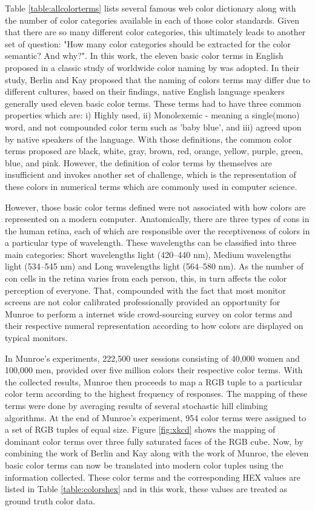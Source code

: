 Table \ref{table:allcolorterms} lists several famous web color dictionary along with the number of color categories available in each of those color standards. Given that there are so many different color categories, this ultimately leads to another set of question: "How many color categories should be extracted for the color semantic? And why?". In this work, the eleven basic color terms in English proposed in a classic study of worldwide color naming by \cite{berlinandkay} was adopted. In their study, Berlin and Kay proposed that the naming of colors terms may differ due to different cultures, based on their findings, native English language speakers generally used eleven basic color terms. These terms had to have three common properties which are: i) Highly used, ii) Monolexemic - meaning a single(mono) word, and not compounded color term such as 'baby blue', and iii) agreed upon by native speakers of the language. With those definitions, the common color terms proposed are black, white, gray, brown, red, orange, yellow, purple, green, blue, and pink. However, the definition of color terms by themselves are insufficient and invokes another set of challenge, which is the representation of these colors in numerical terms which are commonly used in computer science. 

However, those basic color terms defined were not associated with how colors are represented on a modern computer. Anatomically, there are three types of cons in the human retina, each of which are responsible over the receptiveness of colors in a particular type of wavelength. These wavelengths can be classified into three main categories: Short wavelengths light (420–440 nm), Medium  wavelengths light (534–545 nm) and Long wavelengths light (564–580 nm). As the number of con cells in the retina varies from each person, this, in turn affects the color perception of everyone. That, compounded with the fact that most monitor screens are not color calibrated professionally provided an opportunity for Munroe \cite{munroe2010color} to perform a internet wide crowd-sourcing survey on color terms and their respective numeral representation according to how colors are displayed on typical monitors.

In Munroe's experiments, 222,500 user sessions consisting of 40,000 women and 100,000 men, provided over five million colors their respective color terms. With the collected results, Munroe then proceeds to map a RGB tuple to a particular color term according to the highest frequency of responses. The mapping of these terms were done by averaging results of several stochastic hill climbing algorithms. At the end of Munroe's experiment, 954 color terms were assigned to a set of RGB tuples of equal size. Figure \ref{fig:xkcd} shows the mapping of dominant color terms over three fully saturated faces of the RGB cube. Now, by combining the work of Berlin and Kay along with the work of Munroe, the eleven basic color terms can now be translated into modern color tuples using the information collected. These color terms and the corresponding HEX values are listed in Table \ref{table:colorshex} and in this work, these values are treated as ground truth color data. 


